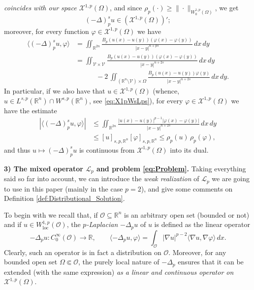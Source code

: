 \documentclass[11pt,a4paper]{amsart}
\def \R {\mathbb{R}}
\def \LL {\mathcal{L}}
\def \Oo {\mathcal{O}}
\theoremstyle{definition}
\theoremstyle{plain}
\numberwithin{equation}{section}
\begin{document}
 \emph{coincides with our space $\mathcal{X}^{1,p}(\Omega)$},
 and since $\rho_p(\cdot)\geq \|\cdot\|_{W_0^{1,p}(\Omega)}$, we get
 $$(-\Delta)^s_pu\in (\mathcal{X}^{1,p}(\Omega))';$$ 
 moreover, for every function $\varphi\in \mathcal{X}^{1,p}(\Omega)$ we have
\begin{equation} \label{eq:explicitDeltapsX1p}
\begin{split}
	 \langle (-\Delta)^s_p u,\varphi\rangle & = \iint_{\R^{2n}}\frac{B_p(u(x)-u(y))
 (\varphi(x)-\varphi(y))}{|x-y|^{n+ps}}\,dx\,dy
 \\
 & = \iint_{\mathcal{V}\times\mathcal{V}}\frac{B_p(u(x)-u(y))
 (\varphi(x)-\varphi(y))}{|x-y|^{n+2s}}\,dx\,dy
 \\
 &\qquad\quad-2\,\iint_{(\R^n\setminus\mathcal{V})\times\Omega}
 \frac{B_p(u(x)-u(y))\varphi(y)}{|x-y|^{n+2s}}\,dx\,dy.
\end{split}
\end{equation}
In particular, if we also have that $u\in\mathcal{X}^{1,p}(\Omega)$ (whence,
$u\in L^{s,p}(\mathbb{R}^n)\cap W^{s,p}(\mathbb{R}^n)$, see \eqref{eq:X1pWsLps}), for every $\varphi\in \mathcal{X}^{1,p}(\Omega)$
we have the estimate
\begin{equation} \label{eq:DeltapsonX1pbuono}
\begin{split}
|\langle (-\Delta)^s_p u,\varphi\rangle| & \leq
\iint_{\R^{2n}}\frac{|u(x)-u(y)|^{p-1}|\varphi(x)-\varphi(y)|}{|x-y|^{n+2s}}\,dx\,dy \\
& \leq  [u]_{s,p,\mathbb{R}^n}
[\varphi]_{s,p,\mathbb{R}^n}
\leq \rho_p(u)\,\rho_p(\varphi),
\end{split}	
\end{equation}
and thus $u\mapsto (-\Delta)^s_pu$ is continuous from $\mathcal{X}^{1,p}(\Omega)$
into its dual.


\medskip

\noindent\textbf{3) The mixed operator $\LL_{p}$ and problem \eqref{eq:Problem}.}
Taking everything said so far into account, 
we can introduce the \emph{weak realization} of $\mathcal{L}_{p}$ 
we are going to use in this paper (mainly in the case $p = 2$), and
give some comments on Definition \ref{def:Distributional_Solution}.
\vspace{0.1cm}

To begin with we recall that, if 
 $\Oo\subseteq\R^n$ is an arbitrary open set (bounded or not)
 and if $u\in W^{1,p}_{\mathrm{loc}}(\Oo)$, the \emph{$p$-Laplacian} $-\Delta_p u$
 of $u$
 is defined as the {linear operator}
 $$-\Delta_pu:C_0^\infty(\Oo)\to\R,\qquad \langle -\Delta_p u,\varphi\rangle = \int_{\Oo}|\nabla u|^{p-2}\langle
 \nabla u,\nabla \varphi\rangle\,dx.$$
Clearly, such an operator is in fact a distribution on $\mathcal{O}$. Moreover, for any bounded open set $\Omega \Subset \mathcal{O}$, the purely local nature of $-\Delta_p$ ensures that it can be extended (with the same expression) \emph{as a linear and continuous operator on $\mathcal{X}^{1,p}(\Omega)$}.
 \vspace{0.1cm}
 
\end{document}
